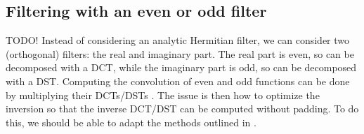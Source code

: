 \documentclass[twocolumn]{article}
\begin{document}
\subsection{Filtering with an even or odd filter}

TODO! Instead of considering an analytic Hermitian filter, we can consider two (orthogonal) filters: the real and imaginary part. The real part is even, so can be decomposed with a DCT, while the imaginary part is odd, so can be decomposed with a DST. Computing the convolution of even and odd functions can be done by multiplying their DCTs/DSTs \cite{martucci}. The issue is then how to optimize the inversion so that the inverse DCT/DST can be computed without padding. To do this, we should be able to adapt the methods outlined in \cite{makhoul}.



\end{document}
